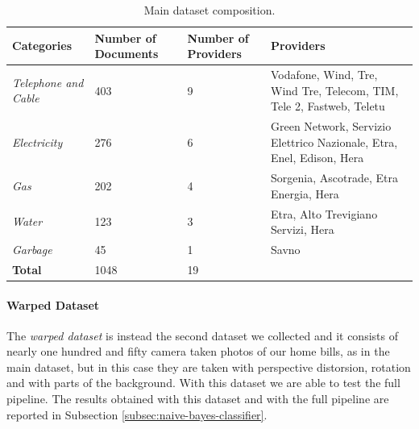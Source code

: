 \documentclass[10pt,twocolumn,letterpaper]{article}
\begin{document}
\bgroup
\def\arraystretch{1.5}%
\begin{table}[!h]
  \begin{center}
    \begin{tabular}{p{1.5cm} p{1.2cm} p{1.2cm} p{3cm}}
      \hline
      Categories                 & Number of Documents & Number of Providers & Providers                                                             \\ \hline
      \emph{Telephone and Cable} & 403                 & 9                   & Vodafone, Wind, Tre, Wind Tre, Telecom, TIM, Tele 2, Fastweb, Teletu  \\
      \emph{Electricity}         & 276                 & 6                   & Green Network, Servizio Elettrico Nazionale, Etra, Enel, Edison, Hera \\
      \emph{Gas}                 & 202                 & 4                   & Sorgenia, Ascotrade, Etra Energia, Hera                               \\
      \emph{Water}               & 123                 & 3                   & Etra, Alto Trevigiano Servizi, Hera                                   \\
      \emph{Garbage}             & 45                  & 1                   & Savno                                                                 \\ \hline
      \textbf{Total}             & 1048                & 19                  &                                                                       \\ \hline
    \end{tabular}
  \end{center}
  \label{table:main-dataset}
  \caption{Main dataset composition.}
\end{table}
\egroup

\paragraph{Warped Dataset}
\label{par:warped-dataset}

The \emph{warped dataset} is instead the second dataset we collected and it 
consists of nearly one hundred and fifty camera taken photos of our
home bills, as in the main dataset, but in this case they are taken
with perspective distorsion, rotation and with parts of the
background. With this dataset we are able to test the full
pipeline. The results obtained with this dataset and with the full
pipeline are reported in Subsection \ref{subsec:naive-bayes-classifier}.
\end{document}

